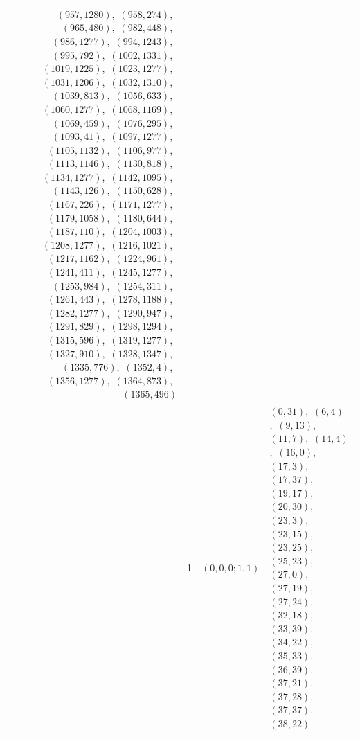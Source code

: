 \documentclass[11pt]{article}
\begin{document}
\begin{longtable}{@{}rrl>{\raggedright\arraybackslash}p{}@{}}
$(957,1280)$,\allowbreak\ $(958,274)$,\allowbreak\ $(965,480)$,\allowbreak\ $(982,448)$,\allowbreak\ $(986,1277)$,\allowbreak\ $(994,1243)$,\allowbreak\ $(995,792)$,\allowbreak\ $(1002,1331)$,\allowbreak\ $(1019,1225)$,\allowbreak\ $(1023,1277)$,\allowbreak\ $(1031,1206)$,\allowbreak\ $(1032,1310)$,\allowbreak\ $(1039,813)$,\allowbreak\ $(1056,633)$,\allowbreak\ $(1060,1277)$,\allowbreak\ $(1068,1169)$,\allowbreak\ $(1069,459)$,\allowbreak\ $(1076,295)$,\allowbreak\ $(1093,41)$,\allowbreak\ $(1097,1277)$,\allowbreak\ $(1105,1132)$,\allowbreak\ $(1106,977)$,\allowbreak\ $(1113,1146)$,\allowbreak\ $(1130,818)$,\allowbreak\ $(1134,1277)$,\allowbreak\ $(1142,1095)$,\allowbreak\ $(1143,126)$,\allowbreak\ $(1150,628)$,\allowbreak\ $(1167,226)$,\allowbreak\ $(1171,1277)$,\allowbreak\ $(1179,1058)$,\allowbreak\ $(1180,644)$,\allowbreak\ $(1187,110)$,\allowbreak\ $(1204,1003)$,\allowbreak\ $(1208,1277)$,\allowbreak\ $(1216,1021)$,\allowbreak\ $(1217,1162)$,\allowbreak\ $(1224,961)$,\allowbreak\ $(1241,411)$,\allowbreak\ $(1245,1277)$,\allowbreak\ $(1253,984)$,\allowbreak\ $(1254,311)$,\allowbreak\ $(1261,443)$,\allowbreak\ $(1278,1188)$,\allowbreak\ $(1282,1277)$,\allowbreak\ $(1290,947)$,\allowbreak\ $(1291,829)$,\allowbreak\ $(1298,1294)$,\allowbreak\ $(1315,596)$,\allowbreak\ $(1319,1277)$,\allowbreak\ $(1327,910)$,\allowbreak\ $(1328,1347)$,\allowbreak\ $(1335,776)$,\allowbreak\ $(1352,4)$,\allowbreak\ $(1356,1277)$,\allowbreak\ $(1364,873)$,\allowbreak\ $(1365,496)$\\
\addlinespace[3pt]
43 & 1 & $(0,0,0;1,1)$ & $(0,31)$,\allowbreak\ $(6,4)$,\allowbreak\ $(9,13)$,\allowbreak\ $(11,7)$,\allowbreak\ $(14,4)$,\allowbreak\ $(16,0)$,\allowbreak\ $(17,3)$,\allowbreak\ $(17,37)$,\allowbreak\ $(19,17)$,\allowbreak\ $(20,30)$,\allowbreak\ $(23,3)$,\allowbreak\ $(23,15)$,\allowbreak\ $(23,25)$,\allowbreak\ $(25,23)$,\allowbreak\ $(27,0)$,\allowbreak\ $(27,19)$,\allowbreak\ $(27,24)$,\allowbreak\ $(32,18)$,\allowbreak\ $(33,39)$,\allowbreak\ $(34,22)$,\allowbreak\ $(35,33)$,\allowbreak\ $(36,39)$,\allowbreak\ $(37,21)$,\allowbreak\ $(37,28)$,\allowbreak\ $(37,37)$,\allowbreak\ $(38,22)$\\

\end{longtable}
\end{document}
